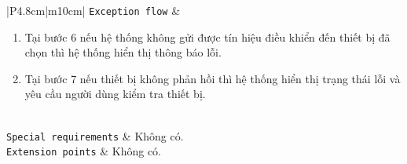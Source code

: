 \begin{longtable}{|P{4.8cm}|m{10cm}|}
	\hline
	\texttt{Exception flow} &
	\begin{enumerate}[label = E\arabic*:]
		\item Tại bước 6 nếu hệ thống không gửi được tín hiệu điều khiển đến thiết bị đã chọn thì hệ thống hiển thị thông báo lỗi.
		\item Tại bước 7 nếu thiết bị không phản hồi thì hệ thống hiển thị trạng thái lỗi và yêu cầu người dùng kiểm tra thiết bị.
	\end{enumerate}
	\\
	\hline
	\texttt{Special requirements} & Không có.\\
	\hline
	\texttt{Extension points} & Không có.\\
	\hline

	\caption{\label{table6}Đặc tả cho Use-case Điều khiển thiết bị thủ công}
\end{longtable}

